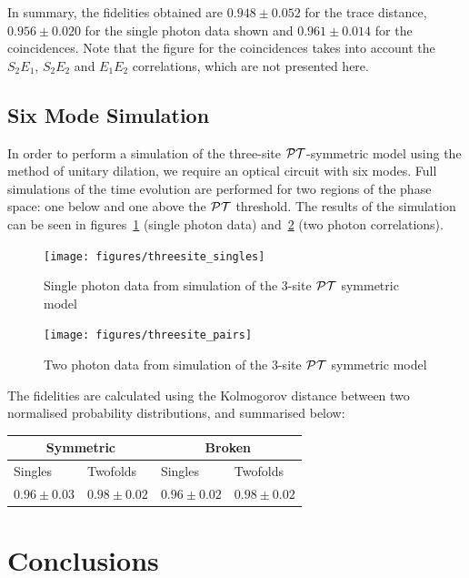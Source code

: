 In summary, the fidelities obtained are \(0.948 \pm 0.052\) for the trace
distance, \(0.956 \pm 0.020\) for the single photon data shown and \(0.961 \pm
0.014\) for the coincidences. Note that the figure for the coincidences takes
into account the \(S_2 E_1\), \(S_2 E_2\) and \(E_1 E_2\) correlations, which
are not presented here.

\subsection{Six Mode Simulation}
\label{sec:SixMode}
In order to perform a simulation of the three-site \(\mathcal{PT}\)-symmetric model using
the method of unitary dilation, we require an optical circuit with six modes.
Full simulations of the time evolution are performed for two regions of the
phase space: one below and one above the \(\mathcal{PT}\) threshold. The results of the
simulation can be seen in figures~\ref{fig:threesitesingles} (single photon
data) and~\ref{fig:threesitetwofolds} (two photon correlations).
\begin{figure}[p]
  \centering
  \texttt{[image: figures/threesite\_singles]}
  \caption[Single photon data from simulation of the 3-site PT symmetric model]
  {Single photon data from simulation of the 3-site \(\mathcal{PT}\) symmetric model}
  \label{fig:threesitesingles}
\end{figure}

\begin{figure}[p]
  \centering
  \texttt{[image: figures/threesite\_pairs]}
  \caption[Two photon data from simulation of the 3-site PT symmetric model]
  {Two photon data from simulation of the 3-site \(\mathcal{PT}\) symmetric model}
  \label{fig:threesitetwofolds}
\end{figure}

The fidelities are calculated using the Kolmogorov distance between two
normalised probability distributions, and summarised below:

\begin{tabular}{|l|l|l|l|}
  \hline
  \multicolumn{2}{|c|}{Symmetric} & \multicolumn{2}{|c|}{Broken} \\
  \hline
  Singles & Twofolds & Singles & Twofolds \\
  \hline
  \(0.96 \pm 0.03\) & \(0.98 \pm 0.02\) & \(0.96 \pm 0.02\) &
  \(0.98 \pm 0.02\) \\
  \hline
\end{tabular}

\section{Conclusions}

